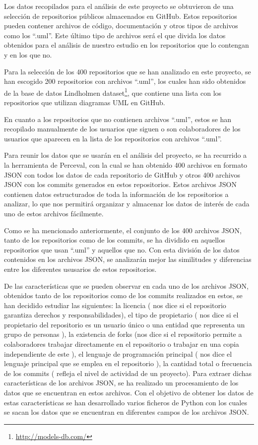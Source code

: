 \documentclass[a4paper, 12pt]{book}
\begin{document}
Los datos recopilados para el análisis de este proyecto se obtuvieron de una selección de repositorios públicos almacenados en GitHub. 
Estos repositorios pueden contener archivos de código, documentación y otros tipos de archivos como los ``.uml''.
Este último tipo de archivos será el que divida los datos obtenidos para el análisis de nuestro estudio en los repositorios que lo contengan y en los que no.


Para la selección de los 400 repositorios que se han analizado en este proyecto, se han escogido 200 repositorios con archivos ``.uml'', los cuales han sido obtenidos de la base de datos Lindholmen dataset\footnote{\url{http://models-db.com/}}, que contiene una lista con los repositorios que utilizan diagramas UML en GitHub.


En cuanto a los repositorios que no contienen archivos ``.uml'', estos se han recopilado manualmente de los usuarios que siguen o son colaboradores de los usuarios que aparecen en la lista de los repositorios con archivos ``.uml''.


Para reunir los datos que se usarán en el análisis del proyecto, se ha recurrido a la herramienta de Perceval, con la cual se han obtenido 400 archivos en formato JSON con todos los datos de cada repositorio de GitHub y otros 400 archivos JSON con los commits generados en estos repositorios.
Estos archivos JSON contienen datos estructurados de toda la información de los repositorios a analizar, lo que nos permitirá organizar y almacenar los datos de interés de cada uno de estos archivos fácilmente. 


Como se ha mencionado anteriormente, el conjunto de los 400 archivos JSON, tanto de los repositorios como de los commits, se ha dividido en aquellos repositorios que usan ``.uml'' y aquellos que no. 
Con esta división de los datos contenidos en los archivos JSON, se analizarán mejor las similitudes y diferencias entre los diferentes ususarios de estos repositorios. 


De las características que se pueden observar en cada uno de los archivos JSON, obtenidos tanto de los repositorios como de los commits realizados en estos, se han decidido estudiar las siguientes: la licencia ( nos dice si el repositorio garantiza derechos y responsabilidades),
el tipo de propietario ( nos dice si el propietario del repositorio es un usuario único o una entidad que representa un grupo de personas ), la existencia de forks (nos dice si el repositorio permite a colaboradores trabajar directamente en el repositorio o trabajar en una copia independiente de este ),
el lenguaje de programación principal ( nos dice el lenguaje principal que se emplea en el repositorio ), la cantidad total o frecuencia de los commits ( refleja el nivel de actividad de un proyecto).
Para extraer dichas características de los archivos JSON, se ha realizado un procesamiento de los datos que se encuentran en estos archivos.
Con el objetivo de obtener los datos de estas características se han desarrollado varios ficheros de Python con los cuales se sacan los datos que se encuentran en diferentes campos de los archivos JSON.
\end{document}
